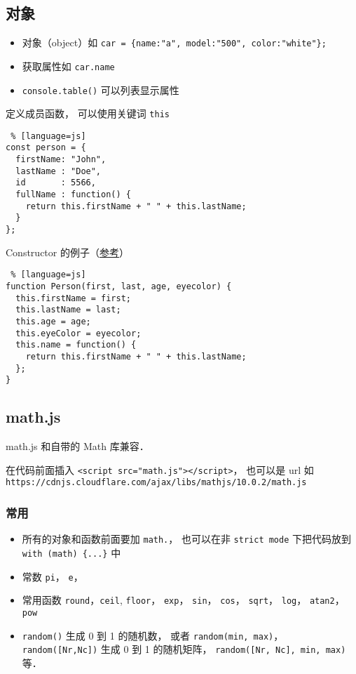 \subsection{对象}
\begin{itemize}
\item 对象（object）如 \verb|car = {name:"a", model:"500", color:"white"};|
\item 获取属性如 \verb|car.name|
\item \verb|console.table()| 可以列表显示属性
\end{itemize}

定义成员函数， 可以使用关键词 \verb|this|
\begin{lstlisting} % [language=js]
const person = {
  firstName: "John",
  lastName : "Doe",
  id       : 5566,
  fullName : function() {
    return this.firstName + " " + this.lastName;
  }
};
\end{lstlisting}

Constructor 的例子（\href{https://www.w3schools.com/js/js_object_constructors.asp}{参考}）
\begin{lstlisting} % [language=js]
function Person(first, last, age, eyecolor) {
  this.firstName = first;
  this.lastName = last;
  this.age = age;
  this.eyeColor = eyecolor;
  this.name = function() {
    return this.firstName + " " + this.lastName;
  };
}
\end{lstlisting}


\subsection{math.js}
math.js 和自带的 Math 库兼容．

在代码前面插入 \verb|<script src="math.js"></script>|， 也可以是 url 如 \verb|https://cdnjs.cloudflare.com/ajax/libs/mathjs/10.0.2/math.js|

\subsubsection{常用}
\begin{itemize}
\item 所有的对象和函数前面要加 \verb|math.|， 也可以在非 \verb|strict mode| 下把代码放到 \verb|with (math) {...}| 中
\item 常数 \verb|pi|， \verb|e|， 
\item 常用函数 \verb|round|，\verb|ceil|, \verb|floor|， \verb|exp|， \verb|sin|， \verb|cos|， \verb|sqrt|， \verb|log|， \verb|atan2|， \verb|pow|
\item \verb|random()| 生成 0 到 1 的随机数， 或者 \verb|random(min, max)|， \verb|random([Nr,Nc])| 生成 0 到 1 的随机矩阵， \verb|random([Nr, Nc], min, max)| 等．
\end{itemize}

